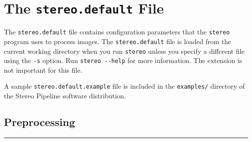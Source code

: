 \chapter{The {\tt stereo.default} File}
\label{ch:stereodefault}

The \texttt{stereo.default} file contains configuration parameters
that the \texttt{stereo} program uses to process images.  The
\texttt{stereo.default} file is loaded from the current working
directory when you run \texttt{stereo} unless you specify a different
file using the \texttt{-s} option. Run \texttt{stereo -\/-help} for
more information. The extension is not important for this file.

A sample \texttt{stereo.default.example} file is included in the
\texttt{examples/} directory of the Stereo Pipeline software
distribution.


\section{Preprocessing}
\label{stereo-default-preprocessing}
\hrule
\bigskip


